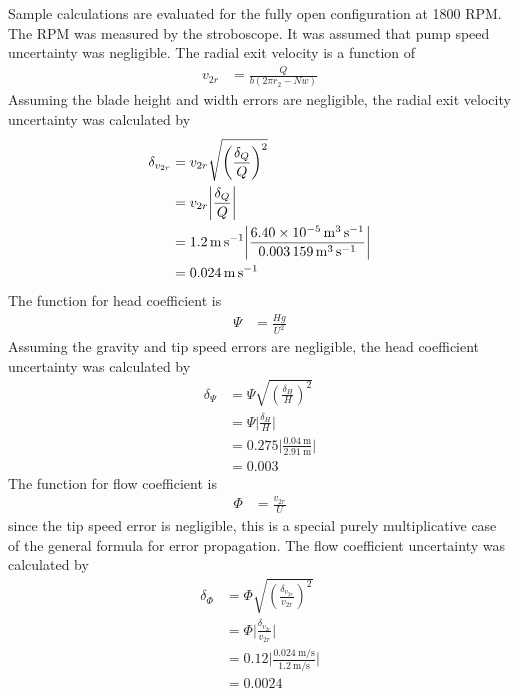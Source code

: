 \FloatBarrier
Sample calculations are evaluated for the fully open configuration at 1800 RPM. The RPM was measured by the stroboscope. It was assumed that pump speed uncertainty was negligible. The radial exit velocity is a function of 
\begin{align*}
    v_{2r} &= \frac{Q}{b(2\pi r_2 - Nw)} 
\end{align*}
Assuming the blade height and width errors are negligible, the radial exit velocity uncertainty was calculated by
\begin{align*}
    \delta_{v_{2r}} &= v_{2r} \sqrt{\left(\frac{\delta_Q}{Q}\right)^2} \\
    &= v_{2r} \bigg|\frac{\delta_Q}{Q}\bigg| \\
    &= \qty{1.2}{\meter\per\second} \bigg|\frac{\qty{6.40E-05}{\meter\cubed\per\second}}{\qty{0.003159}{\meter\cubed\per\second}}\bigg| \\
    &= \qty{0.024}{\meter\per\second}
\end{align*}
The function for head coefficient is
\begin{align*}
    \Psi &= \frac{Hg}{U^2}
\end{align*}
Assuming the gravity and tip speed errors are negligible, the head coefficient uncertainty was calculated by
\begin{align*}
    \delta_{\Psi} &= \Psi \sqrt{\left(\frac{\delta_H}{H}\right)^2} \\
    &= \Psi \bigg|\frac{\delta_H}{H}\bigg| \\
    &= 0.275 \bigg|\frac{\qty{0.04}{\meter}}{\qty{2.91}{\meter}}\bigg| \\
    &= 0.003
\end{align*}
The function for flow coefficient is
\begin{align*}
    \Phi &= \frac{v_{2r}}{U}
\end{align*}
since the tip speed error is negligible, this is a special purely multiplicative case of the general formula for error propagation. The flow coefficient uncertainty was calculated by
\begin{align*}
    \delta_{\Phi} &= \Phi \sqrt{\left(\frac{\delta_{v_{2r}}}{v_{2r}}\right)^2} \\
    &= \Phi \bigg|\frac{\delta_{v_{2r}}}{v_{2r}}\bigg| \\
    &= 0.12 \bigg|\frac{\qty{0.024}{\meter\per\second}}{\qty{1.2}{\meter\per\second}}\bigg| \\
    &= 0.0024
\end{align*}


